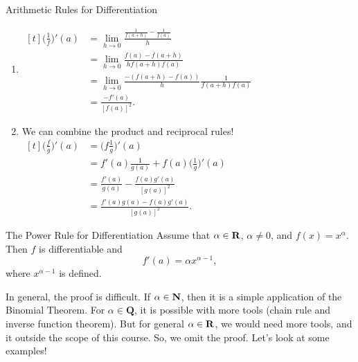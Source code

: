 \begin{Theorem}{Arithmetic Rules for Differentiation}{}
\begin{enumerate}[(1)]
        \item $ \begin{aligned}[t]
                      \biggl(\frac{1}{f}\biggr)'(a)
                       & =\lim\limits_{{h} \to {0}}\frac{\frac{1}{f(a+h)}-\frac{1}{f(a)}}{h}    \\
                       & =\lim\limits_{{h} \to {0}}\frac{f(a)-f(a+h)}{h f(a+h)f(a)}             \\
                       & =\lim\limits_{{h} \to {0}}\frac{-(f(a+h)-f(a))}{h}\frac{1}{f(a+h)f(a)} \\
                       & =\frac{-f'(a)}{[f(a)]^2}.
                  \end{aligned} $
        \item We can combine the product and reciprocal rules!
              $ \begin{aligned}[t]
                      \biggl(\frac{f}{g}\biggr)'(a)
                       & =\biggl(f \frac{1}{g}\biggr)'(a)                       \\
                       & =f'(a)\frac{1}{g(a)}+f(a)\biggl(\frac{1}{g}\biggr)'(a) \\
                       & =\frac{f'(a)}{g(a)}-\frac{f(a)g'(a)}{[g(a)]^2}         \\
                       & =\frac{f'(a)g(a)-f(a)g'(a)}{[g(a)]^2}.
                  \end{aligned} $
    \end{enumerate}
\end{Theorem}
\begin{Theorem}{The Power Rule for Differentiation}{}
    Assume that $ \alpha\in\mathbf{R} $, $ \alpha\ne 0 $, and $ f(x)=x^{\alpha} $. Then $ f $ is differentiable and
    \[ f'(a)=\alpha x^{\alpha-1}, \]
    where $ x^{\alpha-1} $ is defined.
\end{Theorem}
In general, the proof is difficult. If $ \alpha\in\mathbf{N} $, then it is a simple application of the Binomial Theorem.
For $ \alpha\in\mathbf{Q} $, it is possible with more tools (chain rule and inverse function theorem). But for general
$ \alpha\in\mathbf{R} $, we would need more tools, and it outside the scope of this course. So, we omit the proof. Let's look at some examples!
